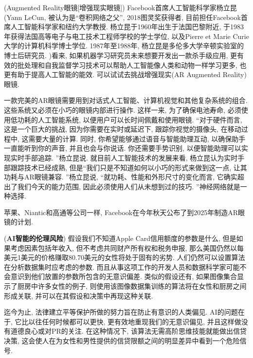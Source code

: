 \begin{example}(Augmented Reality眼镜[增强现实眼镜])
Facebook首席人工智能科学家杨立昆(Yann LeCun, 被认为是“卷积网络之父”, 2018图灵奖获得者, 目前担任Facebook首席人工智能科学家和纽约大学教授. 杨立昆于1960年出生于法国巴黎附近, 于1983年获得法国高等电子与电工技术工程师学校的学士学位, 以及Pierre et Marie Curie大学的计算机科学博士学位. 1987年至1988年, 杨立昆是多伦多大学辛顿实验室的博士后研究员. )看来, 如果机器学习研究员未来想要开发出一款杀手级应用, 更有效的批处理和自我监督学习技术可以帮助人工智能像人类和动物一样学习更多, 也更有助于提高人工智能的能效.
可以试试去挑战增强现实(AR Augmented Reality)眼镜.

一款完美的AR眼镜需要用到对话式人工智能、计算机视觉和其他复杂系统的组合. 这些系统又必须在小巧的眼镜内部进行操作. 这样一来, 为了确保电池寿命, 必须使用低功耗的人工智能系统, 以便用户可以长时间佩戴和使用眼镜.
“对于硬件而言, 这是一个巨大的挑战, 因为你需要在实时或延迟下, 跟踪你视觉的摄像头, 在移动过程中, 这需要大量的计算. 同时, 你希望能够通过语音与智能助理互动, 以确保助手一直能听到你的声音, 并且也会与你说话. 你还需要手势识别, 以便智能助理可以实现实时手部追踪. ”杨立昆说.
就目前人工智能技术的发展来看, 杨立昆认为实时手部跟踪技术已经成熟, 但是“我们只是不知道如何以小巧的形式来做到这一点, 让其功耗与AR眼镜兼容. ”杨立昆说, “就功耗、性能和外形尺寸的变化而言, 它确实超出了我们今天的能力范围, 因此必须使用人们从未想到过的技巧. ”神经网络就是一种选择.

苹果、Niantic和高通等公司一样, Facebook在今年秋天公布了到2025年制造AR眼镜的计划.
\end{example}
\begin{example}(\textbf{AI智能的伦理风险})
假设我们不知道Apple Card信用额度的参数是什么, 但是如果考虑因素包括年收入, 但不考虑共同财产所有权和税务申报, 那么美国仍然以每美元1美元的价格赚取80.70美元的女性将处于固有的劣势.
人们仍然可以设置算法在分析数据集时应考虑的参数. 而且从事这项工作的开发人员和数据科学家可能不会意识到他们放置的参数所包含的无意识偏差.
类似的假设还有, 如果图像集合显示了厨房中许多女性的例子, 则使用该图像数据集训练的算法将在女性和厨房之间形成关联, 并可以在其假设和决策中再现这种关联.

迄今为止, 法律建立平等保护所做的努力旨在防止有意识的人类偏见. AI的问题在于, 它比以往任何时候都可以更快, 更有效地重现我们的无意识偏见, 并且这样做没有道德良心或对PR的关注.
在这种情况下, 该算法无需高阶思维技能就能做出信贷决策, 这会使人在为女性和男性提供的信贷限额之间的明显差异中看到一个危险信号.
\end{example}

